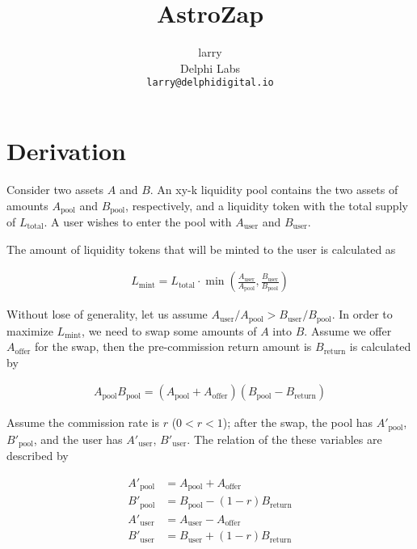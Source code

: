 \documentclass{article}
\title{AstroZap}
\author{
 larry \\
 Delphi Labs \\
 \texttt{larry@delphidigital.io}
}
\begin{document}
\maketitle

\section{Derivation}

Consider two assets $A$ and $B$. An xy-k liquidity pool contains the two assets of amounts $A_{\mathrm{pool}}$ and $B_{\mathrm{pool}}$, respectively, and a liquidity token with the total supply of $L_{\mathrm{total}}$. A user wishes to enter the pool with $A_{\mathrm{user}}$ and $B_{\mathrm{user}}$. 

The amount of liquidity tokens that will be minted to the user is calculated as

\begin{align}
L_{\mathrm{mint}} = L_{\mathrm{total}} \cdot \min \left( \frac{A_{\mathrm{user}}}{A_{\mathrm{pool}}}, \frac{B_{\mathrm{user}}}{B_{\mathrm{pool}}}  \right)
\end{align}

Without lose of generality, let us assume $A_{\mathrm{user}} / A_{\mathrm{pool}} > B_{\mathrm{user}} / B_{\mathrm{pool}}$. In order to maximize $L_{\mathrm{mint}}$, we need to swap some amounts of $A$ into $B$. Assume we offer $A_{\mathrm{offer}}$ for the swap, then the pre-commission return amount is $B_{\mathrm{return}}$ is calculated by 

\begin{align}
A_{\mathrm{pool}} B{_\mathrm{pool}} = \left( A_{\mathrm{pool}} + A_{\mathrm{offer}} \right) \left( B_{\mathrm{pool}} - B_{\mathrm{return}} \right)
\end{align} 

Assume the commission rate is $r$ ($0 < r < 1$); after the swap, the pool has $A'_{\mathrm{pool}}$, $B'_{\mathrm{pool}}$, and the user has $A'_{\mathrm{user}}$, $B'_{\mathrm{user}}$. The relation of the these variables are described by

\begin{align}
A'_{\mathrm{pool}} &= A_{\mathrm{pool}} + A_{\mathrm{offer}} \\
B'_{\mathrm{pool}} &= B_{\mathrm{pool}} - (1-r) B_{\mathrm{return}} \\
A'_{\mathrm{user}} &= A_{\mathrm{user}} - A_{\mathrm{offer}} \\
B'_{\mathrm{user}} &= B_{\mathrm{user}} + (1-r) B_{\mathrm{return}}
\end{align}
\end{document}
